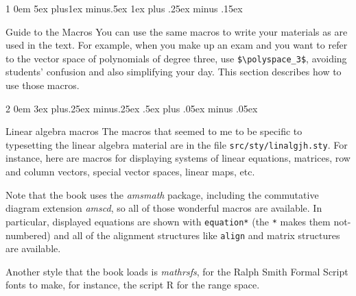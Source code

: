 \documentclass[titlepage]{article}
\makeatletter
\renewcommand{\section}{\@startsection{section}%
  {1}%
  {0em}%
  {5ex plus1ex minus.5ex}%
  {1ex plus .25ex minus .15ex}%
  {\large\bfseries\raggedright}}
\renewcommand{\subsection}{\@startsection{subsection}%
  {2}%
  {0em}%
  {3ex plus.25ex minus.25ex}%
  {.5ex plus .05ex minus .05ex}%
  {\bfseries\raggedright}}
\makeatother
\begin{document}
\section{Guide to the Macros}
You can use the same
macros to write your materials as are used in the text.
For example, when you make up an exam and you want to
refer to the vector space of polynomials of degree three, 
use \verb!$\polyspace_3$!,
avoiding students' confusion and also simplifying your day.  
This section describes how to use those macros.


\subsection{Linear algebra macros}
The macros that seemed to me to be specific to typesetting the
linear algebra material are in the file 
\texttt{src/sty/linalgjh.sty}.
For instance, here are macros for displaying systems of linear equations,
matrices, row and column vectors, special vector spaces, linear maps,
etc.

Note that the book uses the \textit{amsmath} package, 
including the commutative diagram extension \textit{amscd},
so all of those
wonderful macros are available.
In particular, displayed equations are shown with 
\verb|equation*| (the \texttt{*} makes them not-numbered) and all of the 
alignment structures like \verb|align| and matrix structures 
are available.

Another style that the book loads is \textit{mathrsfs}, for the 
Ralph Smith Formal Script fonts to make, for instance, the script R
for the range space.
\end{document}
